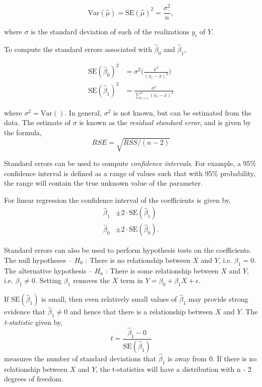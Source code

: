 \documentclass{article}
\begin{document}
\[
    \text{Var} (\hat \mu) = \text{SE} (\hat \mu ) ^2 = \frac{\sigma^2}{n},
\]

where $\sigma$ is the standard deviation of each of the realizations $y_i$ of $Y$.

To compute the standard errors associated with $\hat \beta_0$ and $\hat \beta_1$,

\begin{align*}
    \text{SE} ( \hat \beta_0 )^2 &= \sigma^2 \big (  \frac{\bar x^2}{(x_i - \bar x)^2}  \big )\\ 
    \text{SE} ( \hat \beta_1 )^2 &= \frac{\sigma^2}{\sum_{i=1}^n (x_i - \bar x)^2} 
\end{align*}

where $\sigma^2 = \text{Var}()$. In general, $\sigma^2$ is not known, but can be estimated from the data. The estimate of $\sigma$ is known as the \textit{residual standard error}, and is given by the formula,
\[
    RSE = \sqrt{RSS/(n - 2)}
\]

Standard errors can be used to compute \textit{confidence intervals}. For example, a  95\% confidence interval is defined as a range of values such that with  95\% probability, the range will contain the true unknown value of the parameter.

For linear regression the confidence interval of the coefficients is given by,
\begin{align*}
    \hat \beta_1 &\pm 2 \cdot \text{SE}(\hat \beta_1)  \\
    \hat \beta_0 &\pm 2 \cdot \text{SE}(\hat \beta_0).
\end{align*}

Standard errors can also be used to perform hypothesis tests on the coefficients. The null hypotheses --  $H_0$ : There is no relationship between $X$ and $Y$, i.e. $\beta_1 = 0$. The alternative hypothesis -- $H_a$ : There is some relationship between $X$ and $Y$, i.e. $\beta_1 \neq 0$. Setting $\beta_1$ removes the $X$ term in  $Y = \beta_0 + \beta_1 X + \epsilon$.  


If $\text{SE}(\hat \beta_1)$ is small, then even relatively small values of $\hat \beta_1$ may provide strong evidence that $\hat \beta_1 \neq 0$  and hence that there is a relationship between $X$ and $Y$. The \textit{t-statistic} given by,
\[
    t = \frac{\hat \beta_1 - 0}{\text{SE}(\hat \beta_1)}
\]
measures the number of standard deviations that $\hat \beta_1$ is away from 0. If there is no relationship between $X$ and $Y$, the t-statistics will have a distribution with n - 2 degrees of freedom. 
\end{document}
